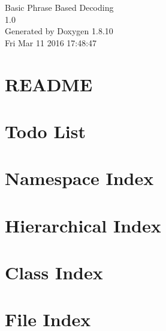 \documentclass[twoside]{book}
\newcommand{\+}{\discretionary{\mbox{\scriptsize$\hookleftarrow$}}{}{}}
\newcommand{\clearemptydoublepage}{%
  \newpage{\pagestyle{empty}\cleardoublepage}%
}
\begin{document}
\hypersetup{pageanchor=false,
             bookmarks=true,
             bookmarksnumbered=true,
             pdfencoding=unicode
            }
\begin{titlepage}
\vspace*{7cm}
\begin{center}%
{\Large Basic Phrase Based Decoding \\[1ex]\large 1.\+0 }\\
\vspace*{1cm}
{\large Generated by Doxygen 1.8.10}\\
\vspace*{0.5cm}
{\small Fri Mar 11 2016 17:48:47}\\
\end{center}
\end{titlepage}
\clearemptydoublepage
\tableofcontents
\clearemptydoublepage
{}
\hypersetup{pageanchor=true}

\chapter{R\+E\+A\+D\+M\+E}
\label{md__r_e_a_d_m_e}
\hypertarget{md__r_e_a_d_m_e}{}

\chapter{Todo List}
\label{todo}
\hypertarget{todo}{}

\chapter{Namespace Index}

\chapter{Hierarchical Index}

\chapter{Class Index}

\chapter{File Index}

\end{document}
